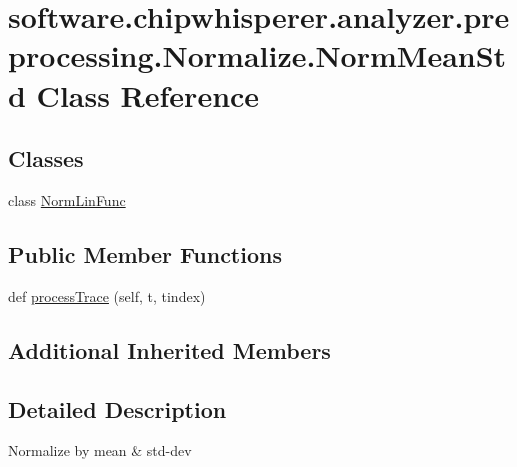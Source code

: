 \hypertarget{classsoftware_1_1chipwhisperer_1_1analyzer_1_1preprocessing_1_1Normalize_1_1NormMeanStd}{}\section{software.\+chipwhisperer.\+analyzer.\+preprocessing.\+Normalize.\+Norm\+Mean\+Std Class Reference}
\label{classsoftware_1_1chipwhisperer_1_1analyzer_1_1preprocessing_1_1Normalize_1_1NormMeanStd}
\subsection*{Classes}
\begin{DoxyCompactItemize}
\item 
class \hyperlink{classsoftware_1_1chipwhisperer_1_1analyzer_1_1preprocessing_1_1Normalize_1_1NormMeanStd_1_1NormLinFunc}{Norm\+Lin\+Func}
\end{DoxyCompactItemize}
\subsection*{Public Member Functions}
\begin{DoxyCompactItemize}
\item 
def \hyperlink{classsoftware_1_1chipwhisperer_1_1analyzer_1_1preprocessing_1_1Normalize_1_1NormMeanStd_a15a20e102f70b339491e4c424401a8ff}{process\+Trace} (self, t, tindex)
\end{DoxyCompactItemize}
\subsection*{Additional Inherited Members}


\subsection{Detailed Description}
\begin{DoxyVerb}Normalize by mean & std-dev \end{DoxyVerb}
 

